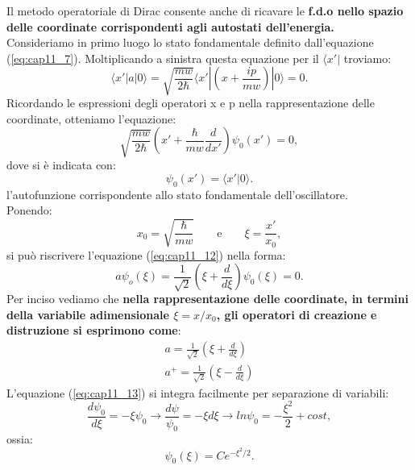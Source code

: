 Il metodo operatoriale di Dirac consente anche di ricavare le \textbf{f.d.o nello spazio delle coordinate corrispondenti agli autostati dell'energia.}\\
 Consideriamo in primo luogo lo stato fondamentale definito dall'equazione (\ref{eq:cap11_7}). Moltiplicando a sinistra questa equazione per il $\langle x'|$ troviamo:
\begin{equation}
\langle x'|a|0 \rangle= \sqrt{\frac{mw}{2\hbar}}\langle x'|(x+\frac{ip}{mw})|0 \rangle=0.
\end{equation}
Ricordando le espressioni degli operatori x e p nella rappresentazione delle coordinate, otteniamo l'equazione:
\begin{equation} \label{eq:cap11_12}
\sqrt{\frac{mw}{2\hbar}}(x'+\frac{\hbar}{mw}\frac{d}{dx'})\psi_0(x')=0,
\end{equation}
dove si è indicata con:
\begin{equation}
\psi_0(x')=\langle x'|0 \rangle.
\end{equation}
l'autofunzione corrispondente allo stato fondamentale dell'oscillatore. \\
Ponendo:
\begin{equation}
x_0=\sqrt{\frac{\hbar}{mw}} \qquad \textrm{e} \qquad \xi=\frac{x'}{x_0},
\end{equation}
si può riscrivere l'equazione (\ref{eq:cap11_12}) nella forma:
\begin{equation}  \label{eq:cap11_13}
a\psi_o(\xi)=\frac{1}{\sqrt{2}}(\xi+\frac{d}{d\xi})\psi_0(\xi)=0.
\end{equation}
Per inciso vediamo che \textbf{nella rappresentazione delle coordinate, in termini della variabile adimensionale $\xi=x/x_0$, gli operatori di creazione e distruzione si esprimono come}:
\begin{equation}    \label{eq:cap11_14}
\begin{split}
	a=\frac{1}{\sqrt{2}} (\xi+\frac{d}{d\xi}) \\
	a^+=\frac{1}{\sqrt{2}} (\xi-\frac{d}{d\xi}) 
\end{split} \end{equation}
 L'equazione (\ref{eq:cap11_13}) si integra facilmente per separazione di variabili:
\begin{equation}
\frac{d\psi_0}{d\xi}=-\xi\psi_0 \rightarrow \frac{d\psi}{\psi_0}=-\xi d\xi \rightarrow ln\psi_0=-\frac{\xi^2}{2}+cost,
\end{equation}
ossia:
\begin{equation}
\psi_0(\xi)=Ce^{-\xi^2/2}.
\end{equation}
